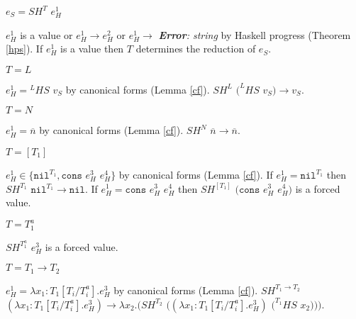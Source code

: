 \begin{case}

$e_{S}=SH^{T}$ $e_{H}^{1}$

$e_{H}^{1}$ is a value or $e_{H}^{1}\rightarrow e_{H}^{2}$ or $e_{H}^{1}\rightarrow$ \emph{\textbf{Error}: string} by Haskell progress (Theorem \ref{hps}).  If $e_{H}^{1}$ is a value then $T$ determines the reduction of $e_{S}$.

\begin{subcase}

$T=L$

$e_{H}^{1}={^{L}H}S$ $v_{S}$ by canonical forms (Lemma \ref{cf}).  $SH^{L}$ $(^{L}HS$ $v_{S})\rightarrow v_{S}$.

\end{subcase}

\begin{subcase}

$T=N$

$e_{H}^{1}=\overline{n}$ by canonical forms (Lemma \ref{cf}).  $SH^{N}$ $\overline{n}\rightarrow\overline{n}$.

\end{subcase}

\begin{subcase}

$T=[T_{1}]$

$e_{H}^{1}\in\lbrace\mathtt{nil}^{T_{1}},\mathtt{cons}$ $e_{H}^{3}$ $e_{H}^{4}\rbrace$ by canonical forms (Lemma \ref{cf}).  If $e_{H}^{1}=\mathtt{nil}^{T_{1}}$ then $SH^{T_{1}}$ $\mathtt{nil}^{T_{1}}\rightarrow\mathtt{nil}$.  If $e_{H}^{1}=\mathtt{cons}$ $e_{H}^{3}$ $e_{H}^{4}$ then $SH^{[T_{1}]}$ $(\mathtt{cons}$ $e_{H}^{3}$ $e_{H}^{4})$ is a forced value.

\end{subcase}

\begin{subcase}

$T=T_{1}^{a}$

$SH^{T_{1}^{a}}$ $e_{H}^{3}$ is a forced value.

\end{subcase}

\begin{subcase}

$T=T_{1}\rightarrow T_{2}$

$e_{H}^{1}=\lambda x_{1}:T_{1}[T_{i}/T_{i}^{a}].e_{H}^{3}$ by canonical forms (Lemma \ref{cf}).  $SH^{T_{1}\rightarrow T_{2}}$ $(\lambda x_{1}:T_{1}[T_{i}/T_{i}^{a}].e_{H}^{3})\rightarrow\lambda x_{2}.(SH^{T_{2}}$ $((\lambda x_{1}:T_{1}[T_{i}/T_{i}^{a}].e_{H}^{3})$ $(^{T_{1}}HS$ $x_{2})))$.


\end{subcase}
\end{case}
